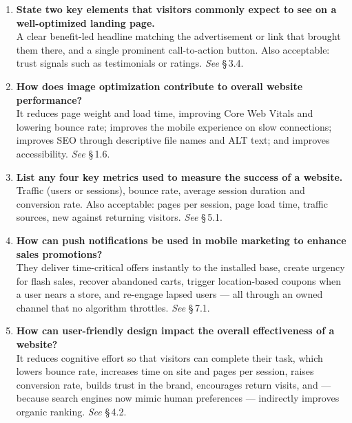 \begin{enumerate}[leftmargin=2.2em,itemsep=1.1ex]
\item \textbf{State two key elements that visitors commonly expect to see on a
      well-optimized landing page.} \\
      A clear benefit-led headline matching the advertisement or link that brought
      them there, and a single prominent call-to-action button. Also acceptable:
      trust signals such as testimonials or ratings. \hfill\emph{See} \S\,3.4.

\item \textbf{How does image optimization contribute to overall website
      performance?} \\
      It reduces page weight and load time, improving Core Web Vitals and
      lowering bounce rate; improves the mobile experience on slow connections;
      improves SEO through descriptive file names and ALT text; and improves
      accessibility. \hfill\emph{See} \S\,1.6.

\item \textbf{List any four key metrics used to measure the success of a website.}
      \\
      Traffic (users or sessions), bounce rate, average session duration and
      conversion rate. Also acceptable: pages per session, page load time,
      traffic sources, new against returning visitors.
      \hfill\emph{See} \S\,5.1.

\item \textbf{How can push notifications be used in mobile marketing to enhance
      sales promotions?} \\
      They deliver time-critical offers instantly to the installed base, create
      urgency for flash sales, recover abandoned carts, trigger location-based
      coupons when a user nears a store, and re-engage lapsed users --- all
      through an owned channel that no algorithm throttles.
      \hfill\emph{See} \S\,7.1.

\item \textbf{How can user-friendly design impact the overall effectiveness of a
      website?} \\
      It reduces cognitive effort so that visitors can complete their task, which
      lowers bounce rate, increases time on site and pages per session, raises
      conversion rate, builds trust in the brand, encourages return visits, and
      --- because search engines now mimic human preferences --- indirectly
      improves organic ranking. \hfill\emph{See} \S\,4.2.


\end{enumerate}
